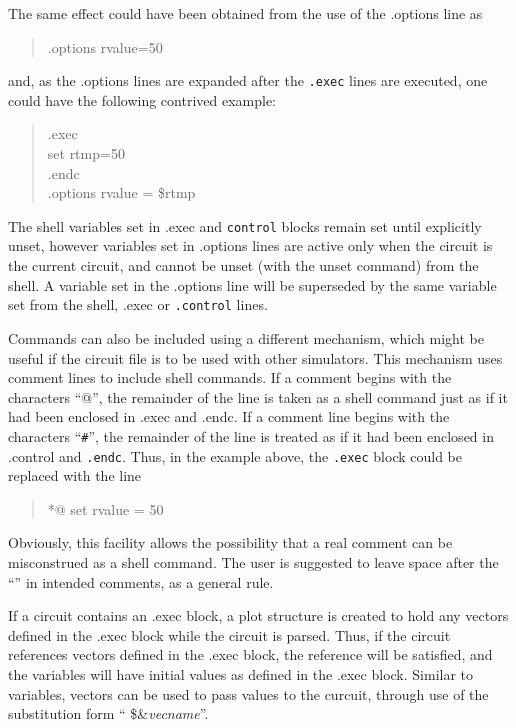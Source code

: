 The same effect could have been obtained from the use of the
{\vt .options} line as
\begin{quote}\vt
.options rvalue=50
\end{quote}
and, as the {\vt .options} lines are expanded after the {\tt .exec} lines
are executed, one could have the following contrived example:
\begin{quote}\vt
.exec\\
set rtmp=50\\
.endc\\
.options rvalue = \$rtmp\\
\end{quote}
The shell variables set in {\vt .exec} and {\tt control} blocks remain
set until explicitly unset, however variables set in {\vt .options}
lines are active only when the circuit is the current circuit, and cannot
be unset (with the {\cb unset} command) from the shell.  A variable set
in the {\vt .options} line will be superseded by the same variable
set from the shell, {\vt .exec} or {\tt .control} lines.

Commands can also be included using a different mechanism, which might
be useful if the circuit file is to be used with other simulators.  This
mechanism uses comment lines to include shell commands.  If a comment
begins with the characters ``{\vt *@}'', the remainder of the line is
taken as a shell command just as if it had been enclosed in {\vt .exec}
and {\vt .endc}.  If a comment line begins with the characters ``{\tt *\#}'',
the remainder of the line is treated as if it had been enclosed in
{\vt .control} and {\tt .endc}.  Thus, in the example above, the {\tt .exec}
block could be replaced with the line
\begin{quote}\vt
*@ set rvalue = 50
\end{quote}
Obviously, this facility allows the possibility that a real comment
can be misconstrued as a shell command.  The user is suggested to
leave space after the ``{\vt *}'' in intended comments, as a general
rule.

If a circuit contains an {\vt .exec} block, a plot structure is
created to hold any vectors defined in the {\vt .exec} block while the
circuit is parsed.  Thus, if the circuit references vectors defined in
the {\vt .exec} block, the reference will be satisfied, and the
variables will have initial values as defined in the {\vt .exec}
block.  Similar to variables, vectors can be used to pass values to
the curcuit, through use of the substitution form ``{\vt
\$\&}{\it vecname}''.

